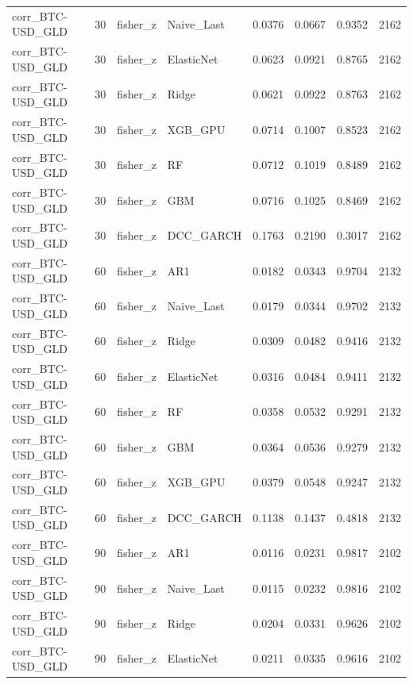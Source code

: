 \begin{table}[H]
\begin{tabular}{llllrrrr}
corr_BTC-USD_GLD & 30 & fisher_z & Naive_Last & 0.0376 & 0.0667 & 0.9352 & 2162 \\
corr_BTC-USD_GLD & 30 & fisher_z & ElasticNet & 0.0623 & 0.0921 & 0.8765 & 2162 \\
corr_BTC-USD_GLD & 30 & fisher_z & Ridge & 0.0621 & 0.0922 & 0.8763 & 2162 \\
corr_BTC-USD_GLD & 30 & fisher_z & XGB_GPU & 0.0714 & 0.1007 & 0.8523 & 2162 \\
corr_BTC-USD_GLD & 30 & fisher_z & RF & 0.0712 & 0.1019 & 0.8489 & 2162 \\
corr_BTC-USD_GLD & 30 & fisher_z & GBM & 0.0716 & 0.1025 & 0.8469 & 2162 \\
corr_BTC-USD_GLD & 30 & fisher_z & DCC_GARCH & 0.1763 & 0.2190 & 0.3017 & 2162 \\
corr_BTC-USD_GLD & 60 & fisher_z & AR1 & 0.0182 & 0.0343 & 0.9704 & 2132 \\
corr_BTC-USD_GLD & 60 & fisher_z & Naive_Last & 0.0179 & 0.0344 & 0.9702 & 2132 \\
corr_BTC-USD_GLD & 60 & fisher_z & Ridge & 0.0309 & 0.0482 & 0.9416 & 2132 \\
corr_BTC-USD_GLD & 60 & fisher_z & ElasticNet & 0.0316 & 0.0484 & 0.9411 & 2132 \\
corr_BTC-USD_GLD & 60 & fisher_z & RF & 0.0358 & 0.0532 & 0.9291 & 2132 \\
corr_BTC-USD_GLD & 60 & fisher_z & GBM & 0.0364 & 0.0536 & 0.9279 & 2132 \\
corr_BTC-USD_GLD & 60 & fisher_z & XGB_GPU & 0.0379 & 0.0548 & 0.9247 & 2132 \\
corr_BTC-USD_GLD & 60 & fisher_z & DCC_GARCH & 0.1138 & 0.1437 & 0.4818 & 2132 \\
corr_BTC-USD_GLD & 90 & fisher_z & AR1 & 0.0116 & 0.0231 & 0.9817 & 2102 \\
corr_BTC-USD_GLD & 90 & fisher_z & Naive_Last & 0.0115 & 0.0232 & 0.9816 & 2102 \\
corr_BTC-USD_GLD & 90 & fisher_z & Ridge & 0.0204 & 0.0331 & 0.9626 & 2102 \\
corr_BTC-USD_GLD & 90 & fisher_z & ElasticNet & 0.0211 & 0.0335 & 0.9616 & 2102 \\
\bottomrule
\end{tabular}
\end{table}